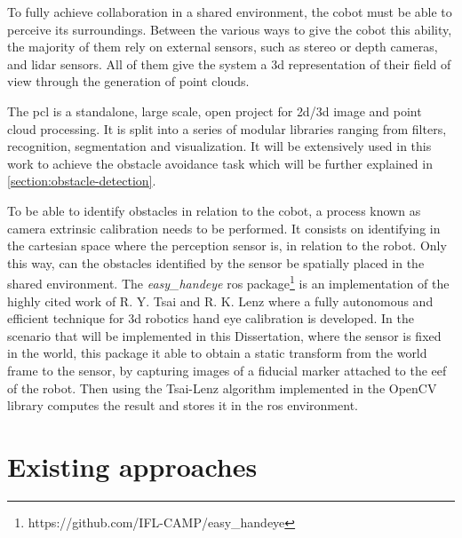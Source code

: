 \par To fully achieve collaboration in a shared environment, the cobot must be able to perceive its surroundings. Between the various ways to give the cobot this ability, the majority of them rely on external sensors, such as stereo or depth cameras, and lidar sensors. All of them give the system a \acs{3d} representation of their field of view through the generation of point clouds.
\par The \ac{pcl} \cite{pcl} is a standalone, large scale, open project for \acs{2d}/\acs{3d} image and point cloud processing. It is split into a series of modular libraries ranging from filters, recognition, segmentation and visualization. It will be extensively used in this work to achieve the obstacle avoidance task which will be further explained in \autoref{section:obstacle-detection}.
\par To be able to identify obstacles in relation to the cobot, a process known as camera extrinsic calibration needs to be performed. It consists on identifying in the cartesian space where the perception sensor is, in relation to the robot. Only this way, can the obstacles identified by the sensor be spatially placed in the shared environment. The \textit{easy\_handeye} \ac{ros} package\footnote{https://github.com/IFL-CAMP/easy\_handeye} is an implementation of the highly cited work of R. Y. Tsai and R. K. Lenz \cite{handeye} where a fully autonomous and efficient technique for \acs{3d} robotics hand eye calibration is developed. In the scenario that will be implemented in this Dissertation, where the sensor is fixed in the world, this package it able to obtain a static transform from the world frame to the sensor, by capturing images of a fiducial marker attached to the \ac{eef} of the robot. Then using the Tsai-Lenz algorithm implemented in the OpenCV library computes the result and stores it in the \ac{ros} environment.






\section{Existing approaches}

